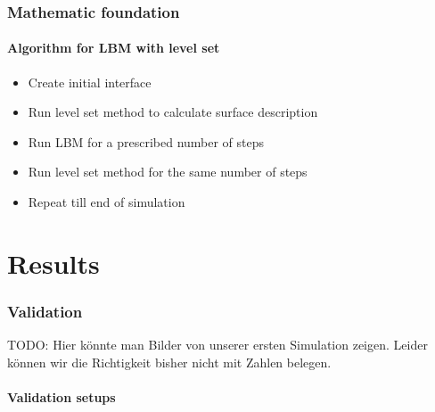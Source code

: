 \documentclass[ucs]{beamer}
\begin{document}
\begin{frame}
\end{frame}

\begin{frame}
\frametitle{Mathematic foundation}
\framesubtitle{Algorithm for LBM with level set}
\begin{itemize}
\item<1-> Create initial interface
\item<2-> Run level set method to calculate surface description
\item<3-> Run LBM for a prescribed number of steps
\item<4-> Run level set method for the same number of steps
\item<5-> Repeat till end of simulation
\end{itemize}
\end{frame}

\section{Results}
\begin{frame}
\frametitle{Validation}
TODO: Hier könnte man Bilder von unserer ersten Simulation zeigen. Leider können wir die Richtigkeit bisher nicht mit Zahlen belegen.
\framesubtitle{Validation setups}
\end{frame}
\end{document}

